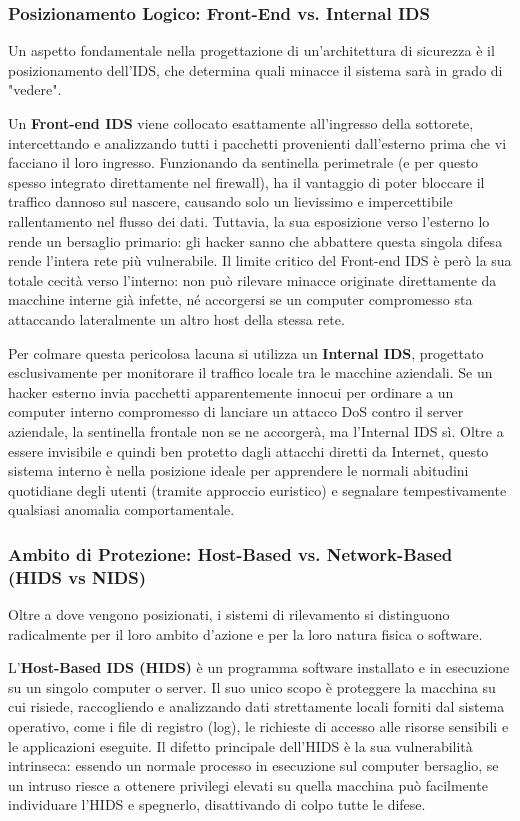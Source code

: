 \documentclass{article}
\begin{document}
\subsubsection*{Posizionamento Logico: Front-End vs. Internal IDS}

Un aspetto fondamentale nella progettazione di un'architettura di sicurezza è il posizionamento dell'IDS, che determina quali minacce il sistema sarà in grado di "vedere".

Un \textbf{Front-end IDS} viene collocato esattamente all'ingresso della sottorete, intercettando e analizzando tutti i pacchetti provenienti dall'esterno prima che vi facciano il loro ingresso. Funzionando da sentinella perimetrale (e per questo spesso integrato direttamente nel firewall), ha il vantaggio di poter bloccare il traffico dannoso sul nascere, causando solo un lievissimo e impercettibile rallentamento nel flusso dei dati. Tuttavia, la sua esposizione verso l'esterno lo rende un bersaglio primario: gli hacker sanno che abbattere questa singola difesa rende l'intera rete più vulnerabile. Il limite critico del Front-end IDS è però la sua totale cecità verso l'interno: non può rilevare minacce originate direttamente da macchine interne già infette, né accorgersi se un computer compromesso sta attaccando lateralmente un altro host della stessa rete.

Per colmare questa pericolosa lacuna si utilizza un \textbf{Internal IDS}, progettato esclusivamente per monitorare il traffico locale tra le macchine aziendali. Se un hacker esterno invia pacchetti apparentemente innocui per ordinare a un computer interno compromesso di lanciare un attacco DoS contro il server aziendale, la sentinella frontale non se ne accorgerà, ma l'Internal IDS sì. Oltre a essere invisibile e quindi ben protetto dagli attacchi diretti da Internet, questo sistema interno è nella posizione ideale per apprendere le normali abitudini quotidiane degli utenti (tramite approccio euristico) e segnalare tempestivamente qualsiasi anomalia comportamentale.

\subsubsection*{Ambito di Protezione: Host-Based vs. Network-Based (HIDS vs NIDS)}

Oltre a dove vengono posizionati, i sistemi di rilevamento si distinguono radicalmente per il loro ambito d'azione e per la loro natura fisica o software.

L'\textbf{Host-Based IDS (HIDS)} è un programma software installato e in esecuzione su un singolo computer o server. Il suo unico scopo è proteggere la macchina su cui risiede, raccogliendo e analizzando dati strettamente locali forniti dal sistema operativo, come i file di registro (log), le richieste di accesso alle risorse sensibili e le applicazioni eseguite. Il difetto principale dell'HIDS è la sua vulnerabilità intrinseca: essendo un normale processo in esecuzione sul computer bersaglio, se un intruso riesce a ottenere privilegi elevati su quella macchina può facilmente individuare l'HIDS e spegnerlo, disattivando di colpo tutte le difese.
\end{document}
